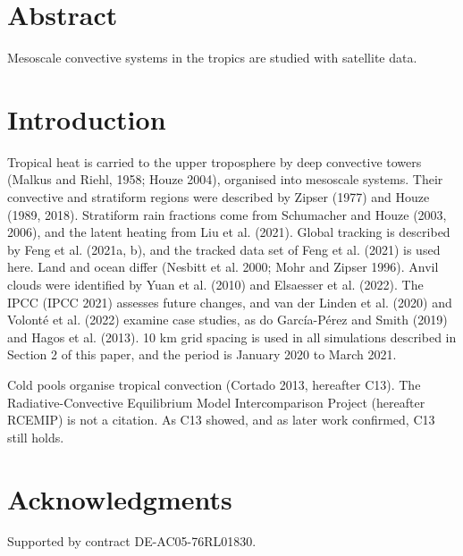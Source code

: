 \documentclass[12pt]{article}
\begin{document}
\section*{Abstract}
Mesoscale convective systems in the tropics are studied with satellite data.

\section{Introduction}
Tropical heat is carried to the upper troposphere by deep convective towers
(Malkus and Riehl, 1958; Houze 2004), organised into mesoscale systems.
Their convective and stratiform regions were described by Zipser (1977) and
Houze (1989, 2018). Stratiform rain fractions come from Schumacher and
Houze (2003, 2006), and the latent heating from Liu et al. (2021).
Global tracking is described by Feng et al. (2021a, b), and the tracked data set
of Feng et al. (2021) is used here. Land and ocean differ (Nesbitt et al. 2000;
Mohr and Zipser 1996). Anvil clouds were identified by Yuan et al. (2010) and
Elsaesser et al. (2022). The IPCC (IPCC 2021) assesses future changes, and
van der Linden et al. (2020) and Volonté et al. (2022) examine case studies,
as do García-Pérez and Smith (2019) and Hagos et al. (2013).
10 km grid spacing is used in all simulations described in Section 2 of this
paper, and the period is January 2020 to March 2021.

Cold pools organise tropical convection (Cortado 2013, hereafter C13). The
Radiative-Convective Equilibrium Model Intercomparison Project (hereafter RCEMIP)
is not a citation. As C13 showed, and as later work confirmed, C13 still holds.

\section{Acknowledgments}
Supported by contract DE-AC05-76RL01830.
\end{document}
